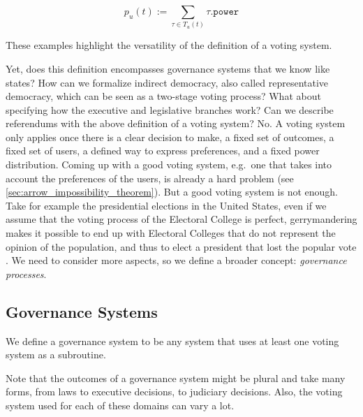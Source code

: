 \begin{equation}
  \label{eqn:power_in_token_based_voting_systems}
  p_u(t) := \sum_{\tau\in T_u(t)}\tau\mathtt{.power}
\end{equation}

These examples highlight the versatility of the definition of a voting system.

Yet, does this definition encompasses governance systems that we know like states?
How can we formalize indirect democracy, also called representative democracy, which can be seen as a two-stage voting process?
What about specifying how the executive and legislative branches work?
Can we describe referendums with the above definition of a voting system?
No.
A voting system only applies once there is a clear decision to make, a fixed set of outcomes, a fixed set of users, a defined way to express preferences, and a fixed power distribution.
Coming up with a good voting system, e.g.\ one that takes into account the preferences of the users, is already a hard problem (see \cref{sec:arrow_impossibility_theorem}).
But a good voting system is not enough.
Take for example the presidential elections in the United States, even if we assume that the voting process of the Electoral College is perfect, gerrymandering makes it possible to end up with Electoral Colleges that do not represent the opinion of the population, and thus to elect a president that lost the popular vote%
.
We need to consider more aspects, so we define a broader concept: \emph{governance processes}.

\subsection{Governance Systems}

\begin{definition}
  \label{def:governance_systems}
  We define a governance system to be any system that uses at least one voting system as a subroutine.
\end{definition}

Note that the outcomes of a governance system might be plural and take many forms, from laws to executive decisions, to judiciary decisions.
Also, the voting system used for each of these domains can vary a lot.

